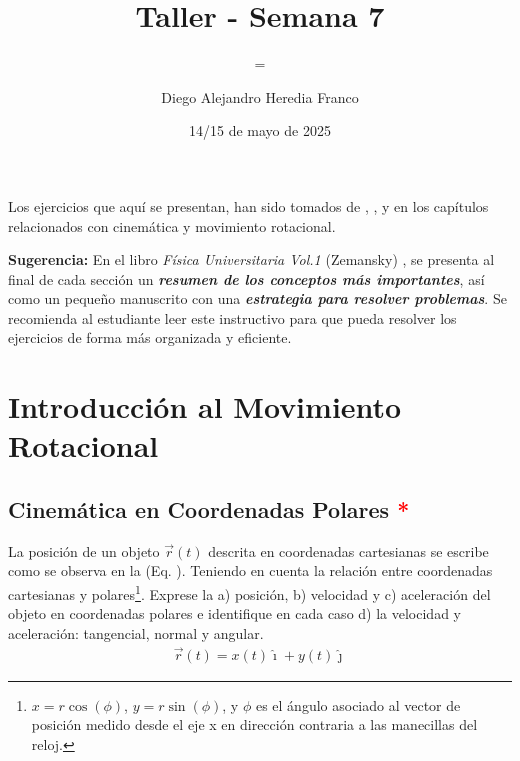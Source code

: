 \documentclass{replab}
\title{Taller - Semana 7}
\author{Diego Alejandro Heredia Franco}
\date{14/15 de mayo de 2025}
\subtitle={Cinemática No. 2}
\begin{document}
\setlength{\parindent}{0pt}
	
	\pagestyle{fancy}
	\unspacedoperators
	
	{\begin{tcolorbox}[colframe=white, colback=principaldos, arc=8pt]
		\begin{center}
			\maketitle

		\end{center}
	\end{tcolorbox}}

	Los ejercicios que aquí se presentan, han sido tomados de \cite{lanaturaleza}, \cite{serway}, \cite{londono} y \cite{sears} en los capítulos relacionados con cinemática y movimiento rotacional.\\

{\begin{tcolorbox}[colframe=red!50!black, colback=red!5!white, arc=8pt]
	\textbf{\textcolor{red!50!black}{Sugerencia:}} En el libro \textit{Física Universitaria Vol.1} (Zemansky) \cite{sears}, se presenta al final de cada sección un \textit{\textbf{resumen de los conceptos más importantes}}, así como un pequeño manuscrito con una \textit{\textbf{estrategia para resolver problemas}}. Se recomienda al estudiante leer este instructivo para que pueda resolver los ejercicios de forma más organizada y eficiente.
\end{tcolorbox}}

\section{Introducción al Movimiento Rotacional}

\subsection{Cinemática en Coordenadas Polares \textcolor{red}{*}}

La posición de un objeto $\vec{r}(t)$ descrita en coordenadas cartesianas se escribe como se observa en la (Eq. ). Teniendo en cuenta la relación entre coordenadas cartesianas y polares\footnote{$x = r\cos(\phi)$, $y = r\sin(\phi)$, y $\phi$ es el ángulo asociado al vector de posición medido desde el eje x en dirección contraria a las manecillas del reloj.}. Exprese la a) posición, b) velocidad y c) aceleración del objeto en coordenadas polares e identifique en cada caso d) la velocidad y aceleración: tangencial, normal y angular.
\begin{align}
	\vec{r}(t) = x(t)\hat{\imath} + y(t)\hat{\jmath}
	\label{eq:posicion}
\end{align}
\end{document}
